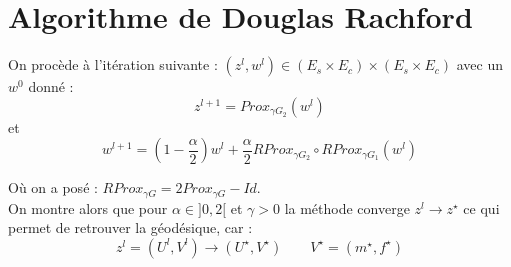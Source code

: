 \documentclass[a4paper,12pt]{article}
\begin{document}
\section{Algorithme de Douglas Rachford}
On procède à l'itération suivante : $(z^l,w^l)\in (E_s\times E_c)\times (E_s\times E_c)$ avec un $w^0$ donné : 
$$
z^{l+1}=Prox_{\gamma G_2} (w^l)
$$
et 
$$
w^{l+1}=(1-\frac{\alpha}{2})w^l + \frac{\alpha}{2}RProx_{\gamma G_2}\circ RProx_{\gamma G_1} (w^l)
$$

Où on a posé : $RProx_{\gamma G} = 2Prox_{\gamma G}-Id$.\\
On montre alors que pour $\alpha\in ]0,2[$ et $\gamma>0$ la méthode converge $z^l\rightarrow z^{\star}$ ce qui permet de retrouver la géodésique, car : 
$$
z^l=(U^l,V^l)\rightarrow (U^{\star},V^{\star}) \qquad V^{\star}=(m^{\star},f^{\star})
$$
\end{document}
